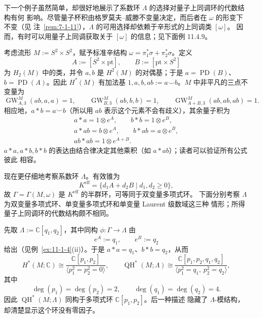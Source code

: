 下一个例子虽然简单，却很好地展示了系数环 $\Lambda$ 的选择对量子上同调环的代数结构有何
影响。尽管量子杯积由格罗莫夫--威滕不变量决定，而后者在 $\omega$ 的形变下不变（见
注~\ref{rem:7-1-11}），$\Lambda$ 的可用选择却依赖于辛形式的上同调类 $[\omega]$。
因而，有时可以用量子上同调获取关于 $[\omega]$ 的信息；见下面例 11.4.9。

\begin{example}\label{ex:11-1-13}
考虑流形 $M:=S^2\times S^2$，赋予标准辛结构
$\omega=\pi_1^*\sigma+\pi_2^*\sigma$。定义
\[
  A:=[S^2\times\mathrm{pt}],\qquad B:=[\mathrm{pt}\times S^2]
\]
为 $H_2(M)$ 中的类，并令 $a,b$ 是 $H^2(M)$ 的对偶基；于是
$a=\operatorname{PD}(B)$、$b=\operatorname{PD}(A)$。因此 $H^*(M)$ 有加法基
$1,a,b,ab:=a\smile b$。$M$ 中非平凡的三点不变量为
\[
  \operatorname{GW}_{A,3}^M(ab,a,a)=1,\qquad
  \operatorname{GW}_{B,3}^M(ab,b,b)=1,\qquad
  \operatorname{GW}_{A+B,3}^M(ab,ab,ab)=1.
\]
相应地，$a*b=a\smile b$（所以用 $ab$ 表示这个元素不会有歧义），其余量子积为
\[
\begin{gathered}
  a*a=1\otimes e^A,\qquad b*b=1\otimes e^B,\\
  a*ab=b\otimes e^A,\qquad b*ab=a\otimes e^B,\\
  ab*ab=1\otimes e^{A+B}.
\end{gathered}
\]
$a*a,a*b,b*b$ 的表达由结合律决定其他乘积（如 $a*ab$）；读者可以验证所有公式彼此
相容。

现在更仔细地考察系数环 $\Lambda$。有效锥为
\[
  K^{\mathrm{eff}}=\{d_1A+d_2B\mid d_1,d_2\ge0\},
\]
故 $\Gamma=\Gamma(M,\omega)$ 是 $K^{\mathrm{eff}}$ 的半群环，可等同于双变量多项式环。
下面分别考察 $\Lambda$ 为双变量多项式环、单变量多项式环和单变量 Laurent 级数域这三种
情形；所得量子上同调环的代数结构颇不相同。

先取 $\Lambda:=\mathbb C[q_1,q_2]$，其中同构 $\phi:\Gamma\to\Lambda$ 由
\[
  e^A:=q_1,\qquad e^B:=q_2
\]
给出（见例~\ref{ex:11-1-4}(ii)）。于是 $a*a=q_1$、$b*b=q_2$，从而
\[
  H^*(M;\mathbb C)\cong
  \frac{\mathbb C[p_1,p_2]}{\langle p_1^2=p_2^2=0\rangle},
  \qquad
  \operatorname{QH}^*(M;\Lambda)\cong
  \frac{\mathbb C[p_1,p_2,q_1,q_2]}
       {\langle p_1^2=q_1,\ p_2^2=q_2\rangle},
\]
其中
\[
  \deg(p_1)=\deg(p_2)=2,\qquad\deg(q_1)=\deg(q_2)=4.
\]
因此 $\operatorname{QH}^*(M;\Lambda)$ 同构于多项式环 $\mathbb C[p_1,p_2]$。后一种描述
隐藏了 $\Lambda$-模结构，却清楚显示这个环没有零因子。


\end{example}
